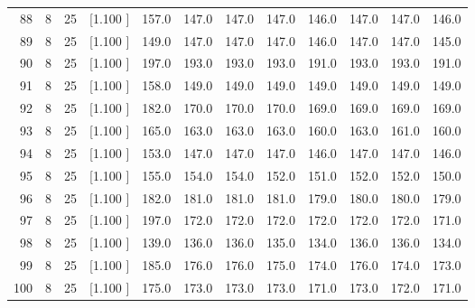 \documentclass[12pt,a4paper]{article}
\begin{document}
\begin{center}
{\begin{tabular}{r r r r r r r r r r r r}
  88&  8& 25&[1.100     ]&   157.0&   147.0&   147.0&   147.0&   146.0&   147.0&   147.0&   146.0\\[-0.02in]
  89&  8& 25&[1.100     ]&   149.0&   147.0&   147.0&   147.0&   146.0&   147.0&   147.0&   145.0\\[-0.02in]
  90&  8& 25&[1.100     ]&   197.0&   193.0&   193.0&   193.0&   191.0&   193.0&   193.0&   191.0\\[-0.02in]
  91&  8& 25&[1.100     ]&   158.0&   149.0&   149.0&   149.0&   149.0&   149.0&   149.0&   149.0\\[-0.02in]
  92&  8& 25&[1.100     ]&   182.0&   170.0&   170.0&   170.0&   169.0&   169.0&   169.0&   169.0\\[-0.02in]
  93&  8& 25&[1.100     ]&   165.0&   163.0&   163.0&   163.0&   160.0&   163.0&   161.0&   160.0\\[-0.02in]
  94&  8& 25&[1.100     ]&   153.0&   147.0&   147.0&   147.0&   146.0&   147.0&   147.0&   146.0\\[-0.02in]
  95&  8& 25&[1.100     ]&   155.0&   154.0&   154.0&   152.0&   151.0&   152.0&   152.0&   150.0\\[-0.02in]
  96&  8& 25&[1.100     ]&   182.0&   181.0&   181.0&   181.0&   179.0&   180.0&   180.0&   179.0\\[-0.02in]
  97&  8& 25&[1.100     ]&   197.0&   172.0&   172.0&   172.0&   172.0&   172.0&   172.0&   171.0\\[-0.02in]
  98&  8& 25&[1.100     ]&   139.0&   136.0&   136.0&   135.0&   134.0&   136.0&   136.0&   134.0\\[-0.02in]
  99&  8& 25&[1.100     ]&   185.0&   176.0&   176.0&   175.0&   174.0&   176.0&   174.0&   173.0\\[-0.02in]
 100&  8& 25&[1.100     ]&   175.0&   173.0&   173.0&   173.0&   171.0&   173.0&   172.0&   171.0\\[-0.02in]

\hline
\end{tabular}}
\end{center}
\end{document}
